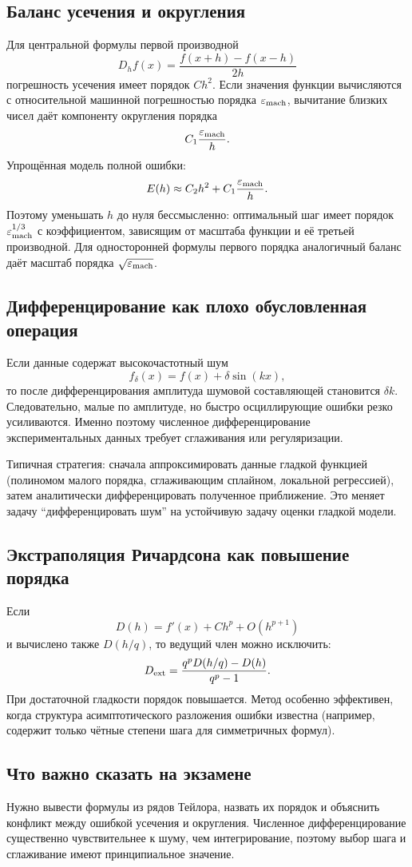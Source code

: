 \subsection{Баланс усечения и округления}

Для центральной формулы первой производной
\[
    D_hf(x)=\frac{f(x+h)-f(x-h)}{2h}
\]
погрешность усечения имеет порядок $Ch^2$. Если значения функции вычисляются с
относительной машинной погрешностью порядка $\varepsilon_{\rm mach}$, вычитание близких
чисел даёт компоненту округления порядка
\[
    C_1\frac{\varepsilon_{\rm mach}}{h}.
\]
Упрощённая модель полной ошибки:
\[
    E(h)\approx C_2h^2+C_1\frac{\varepsilon_{\rm mach}}{h}.
\]
Поэтому уменьшать $h$ до нуля бессмысленно: оптимальный шаг имеет порядок
$\varepsilon_{\rm mach}^{1/3}$ с коэффициентом, зависящим от масштаба функции и её
третьей производной. Для односторонней формулы первого порядка аналогичный баланс даёт
масштаб порядка $\sqrt{\varepsilon_{\rm mach}}$.

\subsection{Дифференцирование как плохо обусловленная операция}

Если данные содержат высокочастотный шум
\[
    f_\delta(x)=f(x)+\delta\sin(kx),
\]
то после дифференцирования амплитуда шумовой составляющей становится $\delta k$.
Следовательно, малые по амплитуде, но быстро осциллирующие ошибки резко усиливаются.
Именно поэтому численное дифференцирование экспериментальных данных требует
сглаживания или регуляризации.

Типичная стратегия: сначала аппроксимировать данные гладкой функцией (полиномом малого
порядка, сглаживающим сплайном, локальной регрессией), затем аналитически
дифференцировать полученное приближение. Это меняет задачу ``дифференцировать шум'' на
устойчивую задачу оценки гладкой модели.

\subsection{Экстраполяция Ричардсона как повышение порядка}

Если
\[
    D(h)=f'(x)+Ch^p+O(h^{p+1})
\]
и вычислено также $D(h/q)$, то ведущий член можно исключить:
\[
    D_{\rm ext}
    =\frac{q^pD(h/q)-D(h)}{q^p-1}.
\]
При достаточной гладкости порядок повышается. Метод особенно эффективен, когда структура
асимптотического разложения ошибки известна (например, содержит только чётные степени
шага для симметричных формул).

\subsection{Что важно сказать на экзамене}

Нужно вывести формулы из рядов Тейлора, назвать их порядок и объяснить конфликт
между ошибкой усечения и округления. Численное дифференцирование существенно
чувствительнее к шуму, чем интегрирование, поэтому выбор шага и сглаживание имеют
принципиальное значение.

\newpage